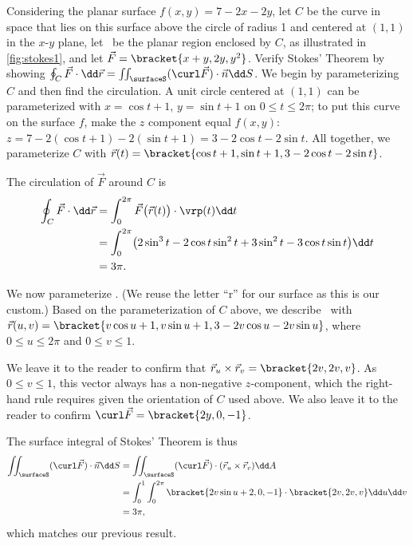 \begin{example}\label{ex_stokes1}
Considering the planar surface $f(x,y) = 7-2x-2y$, let $C$ be the curve in space that lies on this surface above the circle of radius 1 and centered at $(1,1)$ in the $x$-$y$ plane, let \surfaceS\ be the planar region enclosed by $C$, as illustrated in \autoref{fig:stokes1}, and let $\vec F =\bracket{x+y,2y, y^2}$. Verify Stokes' Theorem by showing $\oint_C \vec F\cdot\dd\vec r = \iint_\surfaceS (\curl\vec F)\cdot \vec n\dd S$.
\solution
We begin by parameterizing $C$ and then find the circulation. A unit circle centered at $(1,1)$ can be parameterized with $x=\cos t+1$, $y=\sin t+1$ on $0\leq t\leq 2\pi$; to put this curve on the surface $f$, make the $z$ component equal $f(x,y)$: $z = 7-2(\cos t+1)-2(\sin t+1)  = 3-2\cos t - 2\sin t$. All together, we parameterize $C$ with $\vec r(t) =\bracket{\cos t+1, \sin t+1, 3-2\cos t-2\sin t}$. 

The circulation of $\vec F$ around $C$ is
\begin{align*}
	\oint_C\vec F\cdot\dd\vec r
	&= \int_0^{2\pi}\vec F\bigl(\vec r(t)\bigr)\cdot \vrp(t)\dd t \\
	&= \int_0^{2\pi}\bigl(2\sin^3t-2\cos t\sin^2t+3\sin^2t-3\cos t\sin t\bigr)\dd t \\
	&= 3\pi.
\end{align*}

We now parameterize \surfaceS. (We reuse the letter ``r'' for our surface as this is our custom.) Based on the parameterization of $C$ above, we describe \surfaceS\ with $\vec r(u,v) =\bracket{v\cos u+1, v\sin u+1, 3-2v\cos u-2v\sin u}$, where $0\leq u\leq 2\pi$ and $0\leq v\leq 1$. 

We leave it to the reader to confirm that $\vec r_u\times \vec r_v =\bracket{2v,2v,v}$. As $0\leq v\leq 1$, this vector always has a non-negative $z$-component, which the right-hand rule requires given the orientation of $C$ used above. We also leave it to the reader to confirm $\curl\vec F =\bracket{2y,0,-1}$.

The surface integral of Stokes' Theorem is thus
\begin{align*}
	\iint_\surfaceS (\curl\vec F)\cdot \vec n\dd S
	&= \iint_\surfaceS (\curl\vec F)\cdot (\vec r_u\times \vec r_v)\dd A \\
	&= \int_0^1\int_0^{2\pi}\bracket{2v\sin u+2,0,-1}\cdot\bracket{2v,2v,v}\dd u\dd v\\
	&= 3\pi,
\end{align*}
which matches our previous result.
\end{example}

